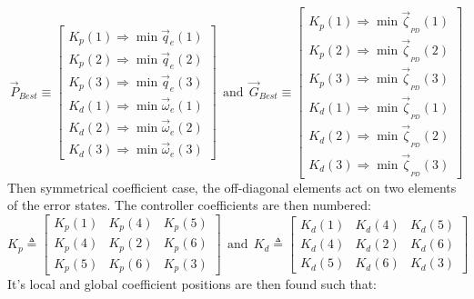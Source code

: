\begin{equation}
\vec{P}_{Best}\equiv
\begin{bmatrix}
K_p(1)\Rightarrow \min \vec{q}_e(1)\\
K_p(2)\Rightarrow \min \vec{q}_e(2)\\
K_p(3)\Rightarrow \min \vec{q}_e(3)\\
K_d(1)\Rightarrow \min \vec{\omega}_e(1)\\
K_d(2)\Rightarrow \min \vec{\omega}_e(2)\\
K_d(3)\Rightarrow \min \vec{\omega}_e(3)
\end{bmatrix}~~\text{and}~~\vec{G}_{Best}\equiv\begin{bmatrix}
K_p(1)\Rightarrow \min \vec{\zeta}_{_{PD}}(1)\\
K_p(2)\Rightarrow \min \vec{\zeta}_{_{PD}}(2)\\
K_p(3)\Rightarrow \min \vec{\zeta}_{_{PD}}(3)\\
K_d(1)\Rightarrow \min \vec{\zeta}_{_{PD}}(1)\\
K_d(2)\Rightarrow \min \vec{\zeta}_{_{PD}}(2)\\
K_d(3)\Rightarrow \min \vec{\zeta}_{_{PD}}(3)
\end{bmatrix}
\end{equation}
Then symmetrical coefficient case, the off-diagonal elements act on two elements of the error states. The controller coefficients are then numbered:
\begin{equation}\label{eq:simulation-attitde-pd-symmetric-coefficients}
K_p\triangleq \begin{bmatrix}
K_p(1) & K_p(4) & K_p(5)\\
K_p(4) & K_p(2) & K_p(6)\\
K_p(5) & K_p(6) & K_p(3)
\end{bmatrix}
~~\text{and}~~K_d\triangleq \begin{bmatrix}
K_d(1) & K_d(4) & K_d(5)\\
K_d(4) & K_d(2) & K_d(6)\\
K_d(5) & K_d(6) & K_d(3)
\end{bmatrix}
\end{equation}
It's local and global coefficient positions are then found such that:
